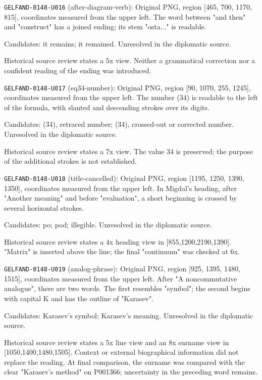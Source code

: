 \noindent\texttt{GELFAND-0148-U016} (after-diagram-verb): Original PNG, region [465, 700, 1170, 815], coordinates measured from the upper left. The word between "and then" and "construct" has a joined ending; its stem "osta..." is readable.\par
Candidates: it remains; it remained. Unresolved in the diplomatic source.\par
Historical source review states a 5x view. Neither a grammatical correction nor a confident reading of the ending was introduced.\par

\noindent\texttt{GELFAND-0148-U017} (eq34-number): Original PNG, region [90, 1070, 255, 1245], coordinates measured from the upper left. The number (34) is readable to the left of the formula, with slanted and descending strokes over its digits.\par
Candidates: (34), retraced number; (34), crossed-out or corrected number. Unresolved in the diplomatic source.\par
Historical source review states a 7x view. The value 34 is preserved; the purpose of the additional strokes is not established.\par

\noindent\texttt{GELFAND-0148-U018} (title-cancelled): Original PNG, region [1195, 1250, 1390, 1350], coordinates measured from the upper left. In Migdal's heading, after "Another meaning" and before "evaluation", a short beginning is crossed by several horizontal strokes.\par
Candidates: po; pod; illegible. Unresolved in the diplomatic source.\par
Historical source review states a 4x heading view in [855,1200,2190,1390]. "Matrix" is inserted above the line; the final "continuum" was checked at 6x.\par

\noindent\texttt{GELFAND-0148-U019} (analog-phrase): Original PNG, region [925, 1395, 1480, 1515], coordinates measured from the upper left. After "A noncommutative analogue", there are two words. The first resembles "symbol"; the second begins with capital K and has the outline of "Karasev".\par
Candidates: Karasev's symbol; Karasev's meaning. Unresolved in the diplomatic source.\par
Historical source review states a 5x line view and an 8x surname view in [1050,1400,1480,1505]. Context or external biographical information did not replace the reading. At final comparison, the surname was compared with the clear "Karasev's method" on P001366; uncertainty in the preceding word remains.\par

